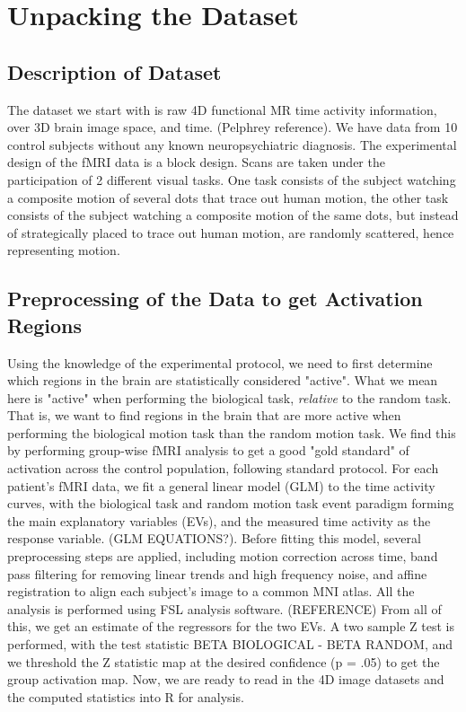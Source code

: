 \documentclass{report}
\begin{document}
\section{Unpacking the Dataset}
\subsection{Description of Dataset}
The dataset we start with is raw 4D functional MR time activity information, over 3D brain image space, and time. (Pelphrey reference). We have data from 10 control subjects without any known neuropsychiatric diagnosis. The experimental design of the fMRI data is a block design. Scans are taken under the participation of 2 different visual tasks. One task consists of the subject watching a composite motion of several dots that trace out human motion, the other task consists of the subject watching a composite motion of the same dots, but instead of strategically placed to trace out human motion, are randomly scattered, hence representing motion.
\subsection{Preprocessing of the Data to get Activation Regions}
Using the knowledge of the experimental protocol, we need to first determine which regions in the brain are statistically considered "active". What we mean here is "active" when performing the biological task, \textit{relative} to the random task. That is, we want to find regions in the brain that are more active when performing the biological motion task than the random motion task. We find this by performing group-wise fMRI analysis to get a good "gold standard" of activation across the control population, following standard protocol. For each patient's fMRI data, we fit a general linear model (GLM) to the time activity curves, with the biological task and random motion task event paradigm forming the main explanatory variables (EVs), and the measured time activity as the response variable. (GLM EQUATIONS?). Before fitting this model, several preprocessing steps are applied, including motion correction across time, band pass filtering for removing linear trends and high frequency noise, and affine registration to align each subject's image to a common MNI atlas. All the analysis is performed using FSL analysis software. (REFERENCE) From all of this, we get an estimate of the regressors for the two EVs.  A two sample Z test is performed, with the test statistic BETA BIOLOGICAL - BETA RANDOM, and we threshold the Z statistic map at the desired confidence (p = .05) to get the group activation map. Now, we are ready to read in the 4D image datasets and the computed statistics into R for analysis.
\end{document}
